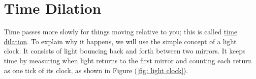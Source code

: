 \section{Time Dilation} \label{sect: Time Dilation}

Time passes more slowly for things moving relative to you; this is called \hyperlink{def-time-dilation}{time dilation}.
To explain why it happens, we will use the simple concept of a light clock.
It consists of light bouncing back and forth between two mirrors.
It keeps time by measuring when light returns to the first mirror and counting each return as one tick of its clock, as shown in Figure (\ref{fig: light clock}).

